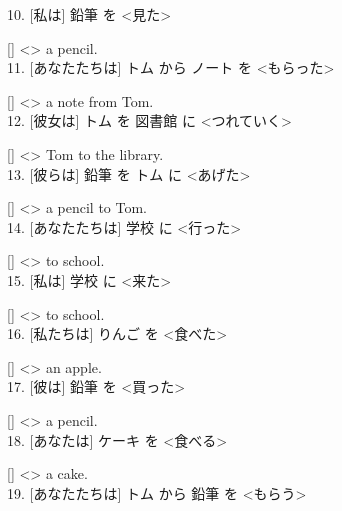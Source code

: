 \documentclass[uplatex,
paper=a4,
fontsize=18pt,
jafontsize=16pt,
number_of_lines=30,
line_length=30zh,
baselineskip=25pt,
]{jlreq}
\begin{document}
10.  [私は] 鉛筆 を <見た>

  [\hspace{3em}] <\hspace{3em}> a pencil.
\\

11.  [あなたたちは] トム から ノート を <もらった>

  [\hspace{3em}] <\hspace{3em}> a note from Tom.
\\

12.  [彼女は] トム を 図書館 に <つれていく>

  [\hspace{3em}] <\hspace{3em}> Tom to the library.
\\

13.  [彼らは] 鉛筆 を トム に <あげた>

  [\hspace{3em}] <\hspace{3em}> a pencil to Tom.
\\

14.  [あなたたちは] 学校 に <行った>

  [\hspace{3em}] <\hspace{3em}> to school.
\\

15.  [私は] 学校 に <来た>

  [\hspace{3em}] <\hspace{3em}> to school.
\\

16.  [私たちは] りんご を <食べた>

  [\hspace{3em}] <\hspace{3em}> an apple.
\\

17.  [彼は] 鉛筆 を <買った>

  [\hspace{3em}] <\hspace{3em}> a pencil.
\\

18.  [あなたは] ケーキ を <食べる>

  [\hspace{3em}] <\hspace{3em}> a cake.
\\

19.  [あなたたちは] トム から 鉛筆 を <もらう>
\end{document}
